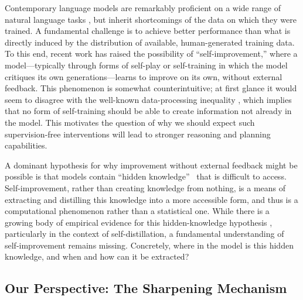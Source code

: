 Contemporary language models are remarkably proficient on a wide range of natural language tasks \citep{brown2020language,ouyang2022training,touvron2023llama,achiam2023gpt,anil2023palm},  
but inherit shortcomings of the data on which they were trained. 
A fundamental challenge is to achieve better performance than what is directly induced by the distribution of available, human-generated training data. To this end, recent
work
\citep{huang2022large,wang2022self,bai2022constitutional,pang2023language,yuan2024self}
has raised the possibility of ``self-improvement,'' where a
model---typically through forms of self-play or self-training in which the
model critiques its own generations---learns to improve on its own,
without external feedback. This phenomenon is somewhat counterintuitive; at first glance it would seem to
disagree with the well-known data-processing inequality
\citep{cover1999elements}, which implies that no form of self-training
should be able to create information not already in the
model. This motivates the question of why we should expect such supervision-free interventions will lead to
stronger reasoning and planning capabilities.\loose%





  A dominant hypothesis for why improvement without external feedback might be possible is that 
  models contain ``hidden knowledge''~\citep{hinton2015distilling} that 
  is difficult to access. Self-improvement, rather than creating knowledge 
  from nothing, is a means of extracting and distilling this knowledge into a more
  accessible form, and thus is a computational
  phenomenon rather than a statistical one. 
  While there is a growing body of empirical evidence for this
  hidden-knowledge hypothesis
  \citep{furlanello2018born,gotmare2019closer,dong2019distillation,abnar2020transferring,allen2020towards},
  particularly in the context of self-distillation, a fundamental understanding of self-improvement remains missing. Concretely, where in the model is this hidden knowledge, and when and how can it be extracted? \loose







        

  \subsection{Our Perspective: The Sharpening Mechanism}

